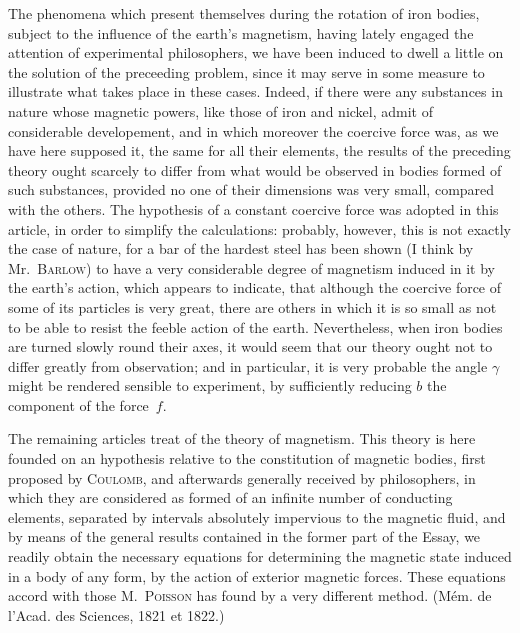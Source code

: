 \documentclass[12pt,notitlepage]{amsart}
\let\Person\textsc
\begin{document}
The phenomena which present themselves during the rotation of iron
bodies, subject to the influence of the earth's magnetism, having lately engaged
the attention of experimental philosophers, we have been induced to dwell a
little on the solution of the preceeding problem, since it may serve in some
measure to illustrate what takes place in these cases. Indeed, if there were
any substances in nature whose magnetic powers, like those of iron and nickel,
admit of considerable developement, and in which moreover the coercive force
was, as we have here supposed it, the same for all their elements, the results
of the preceding theory ought scarcely to differ from what would be observed
in bodies formed of such substances, provided no one of their dimensions was
very small, compared with the others. The hypothesis of a constant coercive
force was adopted in this article, in order to simplify the calculations: 
probably, however, this is not exactly the case of nature,
for a bar of the hardest
steel has been shown (I think by Mr.~\Person{Barlow})
to have a very considerable
degree of magnetism induced in it by the earth's action, which appears to
indicate, that although the coercive force
of some of its particles is very great,
there are others in which it is so small as not to be able to resist the feeble
action of the earth. Nevertheless, when iron bodies are turned slowly round
their axes, it would seem that our theory ought not to differ greatly from
observation;
and in particular, it is very probable the angle $\gamma$ might be rendered
sensible to experiment, by sufficiently reducing $b$
the component of the force~$f$.

The remaining articles treat of the theory of magnetism. This theory
is here founded on an hypothesis relative to the constitution of
magnetic bodies,
first proposed by \Person{Coulomb},
and afterwards generally received by philosophers,
in which they are considered as formed of an infinite number of conducting
elements, separated by intervals absolutely impervious to the magnetic fluid,
and by means of the general results contained in the former part of the Essay,
we readily obtain the necessary equations for determining the magnetic state
induced in a body of any form, by the action of exterior magnetic forces.
These equations accord with those M.~\Person{Poisson}
has found by a very different
method. (M\'em. de l'Acad. des Sciences, 1821 et 1822.)
\end{document}
